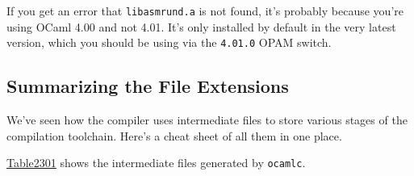 If you get an error that \passthrough{\lstinline!libasmrund.a!} is not
found, it's probably because you're using OCaml 4.00 and not 4.01. It's
only installed by default in the very latest version, which you should
be using via the \passthrough{\lstinline!4.01.0!} OPAM switch. ~

\hypertarget{summarizing-the-file-extensions}{%
\subsection{Summarizing the File
Extensions}\label{summarizing-the-file-extensions}}

We've seen how the compiler uses intermediate files to store various
stages of the compilation toolchain. Here's a cheat sheet of all them in
one place.

\href{compiler-backend.html\#Table2301}{Table2301} shows the
intermediate files generated by \passthrough{\lstinline!ocamlc!}.

